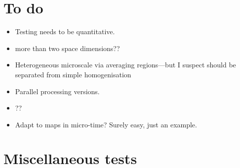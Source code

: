 



\begin{devMan}



\end{devMan}




\begin{devMan}




\section{To do}
\begin{itemize}
\item Testing needs to be quantitative.
\item more than two space dimensions??
\item Heterogeneous microscale via averaging regions---but I suspect should be separated from simple homogenisation
\item Parallel processing versions.
\item ??
\item Adapt to maps in micro-time?  Surely easy, just an example.
\end{itemize}


\section{Miscellaneous tests}



\end{devMan}
